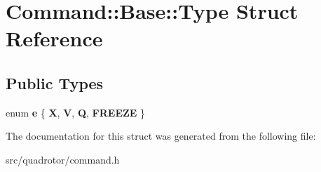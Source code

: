 \hypertarget{structCommand_1_1Base_1_1Type}{
\section{Command::Base::Type Struct Reference}
\label{structCommand_1_1Base_1_1Type}
}
\subsection*{Public Types}
\begin{DoxyCompactItemize}
\item 
enum {\bfseries e} \{ {\bfseries X}, 
{\bfseries V}, 
{\bfseries Q}, 
{\bfseries FREEZE}
 \}
\end{DoxyCompactItemize}


The documentation for this struct was generated from the following file:\begin{DoxyCompactItemize}
\item 
src/quadrotor/command.h\end{DoxyCompactItemize}

